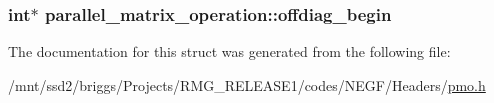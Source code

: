 \hypertarget{structparallel__matrix__operation_a60cfcc0519573d48bd9f7b981bddc638}{
\subsubsection[{offdiag\-\_\-begin}]{\setlength{\rightskip}{0pt plus 5cm}int$\ast$ parallel\-\_\-matrix\-\_\-operation\-::offdiag\-\_\-begin}}\label{structparallel__matrix__operation_a60cfcc0519573d48bd9f7b981bddc638}


The documentation for this struct was generated from the following file\-:\begin{DoxyCompactItemize}
\item 
/mnt/ssd2/briggs/\-Projects/\-R\-M\-G\-\_\-\-R\-E\-L\-E\-A\-S\-E1/codes/\-N\-E\-G\-F/\-Headers/\hyperlink{pmo_8h}{pmo.\-h}\end{DoxyCompactItemize}
